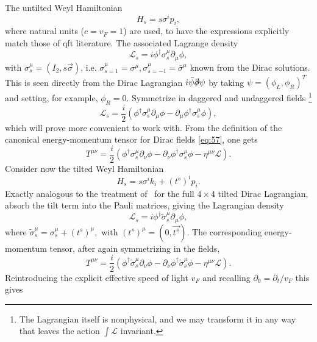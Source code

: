 The untilted Weyl Hamiltonian
\begin{equation}
  H_s = s \sigma^i p_i,
\end{equation}
where natural units (\( c = v_F = 1 \)) are used, to have the expressions explicitly match those of \gls{qft} literature.
The associated Lagrange density~\cite{kachelriessQuantumFieldsHubble2018}
\begin{equation}
  \mathcal{L}_s = i \phi^{\dagger} \sigma_s^{\mu} \partial_{\mu} \phi,
\end{equation}
with \( \sigma_s^{\mu} = (I_2, s \vec{\sigma}) \), i.e. \( \sigma_{s=1}^{\mu} = \sigma^{\mu}, \sigma_{s=-1}^{\mu} = \bar{\sigma}^{\mu} \) known from the Dirac solutions.
This is seen directly from the Dirac Lagrangian \( i \bar{\psi} \slashed{\partial} \psi \) by taking \( \psi = (\phi_L, \phi_R)^T \) and setting, for example, \( \phi_R = 0 \).
Symmetrize in daggered and undaggered fields%
\footnote{The Lagrangian itself is nonphysical, and we may transform it in any way that leaves the action \( \int \mathcal{L} \) invariant.}
\begin{equation}
  \mathcal{L}_s = \frac{i}{2} (\phi^{\dagger} \sigma_s^{\mu} \partial_{\mu} \phi - \partial_{\mu} \phi^{\dagger} \sigma_s^{\mu} \phi),
\end{equation}
which will prove more convenient to work with.
From the definition of the canonical energy-momentum tensor for Dirac fields \cref{eq:57}, one gets
\begin{equation}
  T^{\mu \nu} =
  \frac{i}{2} (
  \phi^{\dagger} \sigma_s^{\mu} \partial_{\nu} \phi
  - \partial_{\nu} \phi^{\dagger} \sigma_s^{\mu} \phi
  - \eta^{\mu \nu} \mathcal{L}
  ).
\end{equation}
Consider now the tilted Weyl Hamiltonian
\begin{equation}
  H_s = s \sigma^ik_i + (t^s)^i p_i.
\end{equation}
Exactly analogous to the treatment of~\textcite{vanderwurffMagnetovorticalThermoelectricTransport2019} for the full \( 4 \times 4 \) tilted Dirac Lagrangian, absorb the tilt term into the Pauli matrices, giving the Lagrangian density
\begin{equation}
  \mathcal{L}_s = i \phi^{\dagger} \tilde{\sigma}_s^{\mu} \partial_{\mu} \phi,
\end{equation}
where \( \tilde{\sigma}_s^{\mu} = \sigma_s^{\mu} + (t^s)^{\mu}, \text{ with } (t^s)^{\mu} = (0, \vec{t^s}) \).
The corresponding energy-momentum tensor, after again symmetrizing in the fields,
\begin{equation}
  \label{eq:T-canon-tilt}
  T^{\mu\nu} =
  \frac{i}{2} (
  \phi^{\dagger} \tilde{\sigma}_s ^{\mu} \partial_{\nu} \phi
  - \partial_{\nu} \phi^{\dagger} \tilde{\sigma}_s ^{\mu} \phi
  - \eta^{\mu \nu} \mathcal{L}
  ).
\end{equation}
Reintroducing the explicit effective speed of light \( v_F \) and recalling \( \partial_0 = \partial_t / v_F \) this gives

